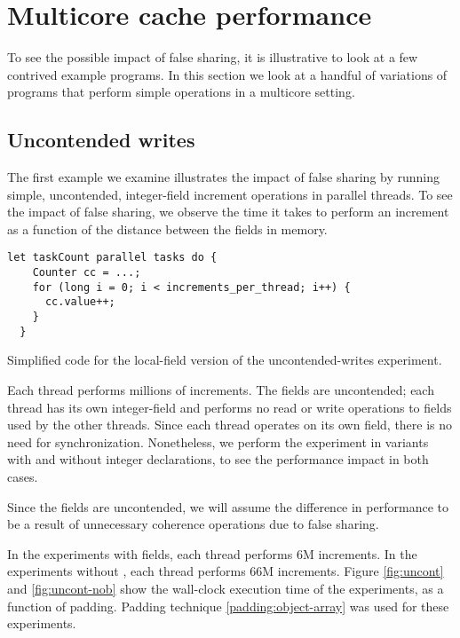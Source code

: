 \section{Multicore cache performance}

To see the possible impact of false sharing, it is illustrative to look at a
few contrived example programs. In this section we look at a handful of
variations of programs that perform simple operations in a multicore
setting.

\subsection{Uncontended writes}
The first example we examine illustrates the impact of false sharing by running
simple, uncontended, integer-field increment operations in parallel threads. To see
the impact of false sharing, we observe the time it takes to perform an
increment as a function of the distance between the fields in memory.

\begin{code}
\begin{Verbatim}[frame=single]
  let taskCount parallel tasks do {
    Counter cc = ...;
    for (long i = 0; i < increments_per_thread; i++) {
      cc.value++;
    }
  }
\end{Verbatim}
	\caption{Simplified code for the local-field version of the uncontended-writes
	experiment.}
	\label{code:uncontended}
\end{code}

Each thread performs millions of increments. The fields are
uncontended; each thread has its own integer-field and performs no read or write
operations to fields used by the other threads. Since each thread operates on
its own field, there is no need for synchronization. Nonetheless, we perform
the experiment in variants with and without  integer declarations, to
see the performance impact in both cases.

Since the fields are uncontended, we will assume the difference in performance
to be a result of unnecessary coherence operations due to false sharing.

In the experiments with  fields, each thread performs 6M increments.
In the experiments without , each thread performs 66M increments. 
Figure \ref{fig:uncont} and \ref{fig:uncont-nob} show the wall-clock execution
time of the experiments, as a function of padding. Padding technique
\ref{padding:object-array} was used for these experiments.


